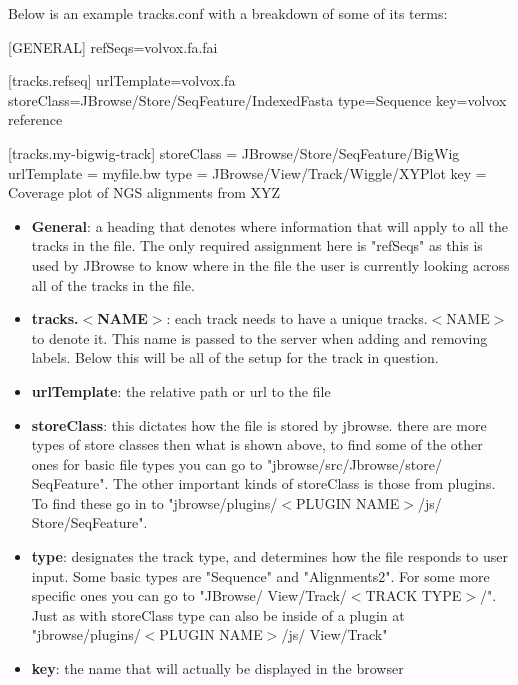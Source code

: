 \documentclass[a4paper,12pt]{article}
\newenvironment{monospace}{\fontfamily{pcr}\selectfont}{\par}
\begin{document}
\newpage
Below is an example tracks.conf with a breakdown of some of its terms: \linebreak

\begin{monospace}

\raggedright [GENERAL] \linebreak
refSeqs=volvox.fa.fai \linebreak

[tracks.refseq] \linebreak
urlTemplate=volvox.fa \linebreak
storeClass=JBrowse/Store/SeqFeature/IndexedFasta \linebreak
type=Sequence \linebreak
key=volvox reference \linebreak

[tracks.my-bigwig-track] \linebreak
storeClass = JBrowse/Store/SeqFeature/BigWig \linebreak
urlTemplate = myfile.bw \linebreak
type = JBrowse/View/Track/Wiggle/XYPlot \linebreak
key = Coverage plot of NGS alignments from XYZ


\end{monospace}

\begin{itemize}
	\item \textbf{General}: a heading that denotes where information that will apply to all the tracks in the file. The only required assignment here is "refSeqs" as this is used by JBrowse to know where in the file the user is currently looking across all of the tracks in the file.
	\item \textbf{tracks.$<$NAME$>$}: each track needs to have a unique tracks.$<$NAME$>$ to denote it. This name is passed to the server when adding and removing labels. Below this will be all of the setup for the track in question.
	\item \textbf{urlTemplate}: the relative path or url to the file
	\item \textbf{storeClass}: this dictates how the file is stored by jbrowse. there are more types of store classes then what is shown above, to find some of the other ones for basic file types you can go to "jbrowse/src/Jbrowse/store/ SeqFeature". The other important kinds of storeClass is those from plugins. To find these go in to "jbrowse/plugins/$<$PLUGIN NAME$>$/js/ Store/SeqFeature".
	\item \textbf{type}: designates the track type, and determines how the file responds to user input. Some basic types are "Sequence" and "Alignments2". For some more specific ones you can go to "JBrowse/ View/Track/$<$TRACK TYPE$>$/". Just as with storeClass type can also be inside of a plugin at "jbrowse/plugins/$<$PLUGIN NAME$>$/js/ View/Track"
	\item \textbf{key}: the name that will actually be displayed in the browser
\end{itemize}
\end{document}
